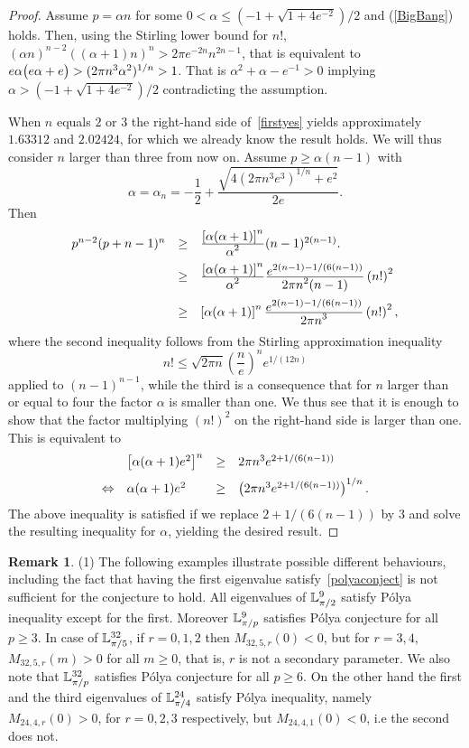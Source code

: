 \documentclass[11pt,a4paper,times]{amsart}
\theoremstyle{plain}
\theoremstyle{definition}
\newtheorem{remark}{Remark}[section]
\numberwithin{equation}{section}
\newcommand{\ds}{\displaystyle}
\newcommand{\eqskip}{ \vspace*{2mm}\\ }
\newcommand{\fr}[2]{\frac{\ds #1}{\ds #2}}
\newcommand{\luned}[2]{\raisebox{0.5pt}{${}$}\mathbb{L}^{#1}_{\pi/#2}}
\begin{document}
{\begin{proof}
 Assume $p=\alpha n$ for some  $0<\alpha\leq (-1+\sqrt{1+4e^{-2}})/2$ and  (\ref{BigBang}) holds.
 Then, using the Stirling lower bound for $n!$, $(\alpha n)^{n-2}((\alpha+1)n)^n> 2\pi e^{-2n}n^{2n-1}$, that is equivalent to
 $e\alpha \big{(}e\alpha +e\big{)}> (2\pi n^3\alpha ^2)^{1/n}>1$. That is $\alpha^2+\alpha -e^{-1}>0$ implying $\alpha > (-1 +\sqrt{1+4e^{-2}})/2$ contradicting the assumption.
 
  When $n$ equals $2$ or $3$ the right-hand side of~\eqref{firstyes} yields approximately $1.63312$ and $2.02424$, for which we
 already know the result holds. We will thus consider $n$ larger than three from now on. Assume $p\geq \alpha (n-1)$ with
 \[
 \alpha = \alpha_{n} = -\fr{1}{2} +\fr{\sqrt{4(2\pi n^3 e^3)^{1/n}+e^2}}{2e}.
 \]
 Then
 \[
 \begin{array}{lll}
  p^{n-2} (p+n-1)^{n} & \geq & \fr{\left[\alpha(\alpha+1)\right]^n}{\alpha^2} (n-1)^{2(n-1)}.\eqskip
  & \geq &  \fr{\left[\alpha(\alpha+1)\right]^n}{\alpha^2} \fr{e^{2(n-1)-1/(6(n-1))}}{2\pi n^2(n-1)}\left(n!\right)^2\eqskip
  & \geq & \left[\alpha(\alpha+1)\right]^n \fr{e^{2(n-1)-1/(6(n-1))}}{2\pi n^3}\left(n!\right)^2,
  \end{array}
 \]
 where the second inequality follows from the Stirling approximation inequality
 \[
  n! \leq \sqrt{2\pi n} \left(\fr{n}{e}\right)^n e^{1/(12n)}
 \]
 applied to $(n-1)^{n-1}$, while the third is a consequence that for $n$ larger than or equal to four the factor $\alpha$ is smaller than one. We thus see that it is enough to show that the factor multiplying $(n!)^2$ on the right-hand
 side is larger than one. This is equivalent to
 \[
  \begin{array}{llll}
    & \left[\alpha(\alpha+1)e^2\right]^n & \geq & 2\pi n^3 e^{2+1/(6(n-1))}\eqskip
    \Leftrightarrow & \alpha(\alpha+1)e^2 & \geq & \left( 2\pi n^3 e^{2+1/(6(n-1))}\right)^{1/n}.
  \end{array}
 \]
 The above inequality is satisfied if we replace $2+1/(6(n-1))$ by $3$ and solve the resulting inequality for $\alpha$,
 yielding the desired result.
 \end{proof}
\begin{remark}
(1) \label{remark_examples1} 
 The following examples illustrate possible different behaviours, including the fact that having the first eigenvalue
 satisfy~\eqref{polyaconject} is not sufficient for the conjecture to hold.
 All eigenvalues of $\luned{9}{2}$ satisfy P\'{o}lya inequality except for the first. Moreover $\luned{9}{p}$ satisfies P\'{o}lya
 conjecture for all $p\geq 3$. In case of $\luned{32}{5}$, if $r=0,1,2$ then $M_{32,5,r}(0)<0$, but for $r=3,4$, $M_{32,5,r}(m)>0$
 for all $m\geq 0$, that is, $r$ is not a secondary parameter. We also note that $\luned{32}{p}$ satisfies P\'{o}lya conjecture for
 all $p\geq 6$. On the other hand the first and the third eigenvalues of $\luned{24}{4}$ satisfy P\'{o}lya inequality, namely
 $M_{24,4,r}(0)>0$, for $r=0,2,3$ respectively, but  $M_{24,4,1}(0)<0$, i.e the second does not.
\end{remark}

}
\end{document}
